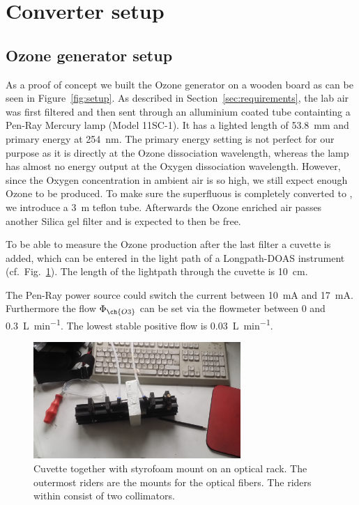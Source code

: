 \section{Converter setup}
\label{sec:setup}

\subsection{Ozone generator setup}
\label{sec:ozone-setup}

As a proof of concept we built the Ozone generator on a wooden board
as can be seen in Figure~\ref{fig:setup}. As described in
Section~\ref{sec:requirements}, the lab air was first filtered and
then sent through an alluminium coated tube containting a Pen-Ray
Mercury lamp (Model 11SC-1). It has a lighted length of
\SI{53.8}{\milli\meter} and primary energy at
\SI{254}{\nano\meter}. The primary energy setting is not perfect for
our purpose as it is directly at the Ozone dissociation wavelength,
whereas the lamp has almost no energy output at the Oxygen
dissociation wavelength. However, since the Oxygen concentration in
ambient air is so high, we still expect enough Ozone to be
produced. 
To make sure the superfluous  is completely converted to
, we introduce a \SI{3}{\meter} teflon tube. Afterwards the
Ozone enriched air passes another Silica gel filter and is expected to
then be  free.

To be able to measure the Ozone production after the last filter a
cuvette is added, which can be entered in the light path of a
Longpath-DOAS instrument (cf.\ Fig.~\ref{fig:cuvette}). The length of
the lightpath through the cuvette is \SI{10}{\centi\meter}. 

The Pen-Ray power source could switch the current between
\SI{10}{\milli\ampere} and \SI{17}{\milli\ampere}.  Furthermore the
flow $\Phi_{\ch{O 3}}$ can be set via the flowmeter between \num{0}
and \SI{0.3}{\liter\per\minute}. The lowest stable positive flow is
\SI{0.03}{\liter\per\minute}. 

\begin{figure}[htbp]
  \centering
  \includegraphics[width=0.7\textwidth]{images/cuvette.jpg}
  \caption{Cuvette together with styrofoam mount on an optical
    rack. The outermost riders are the mounts for the optical
    fibers. The riders within consist of two collimators.}
  \label{fig:cuvette}
\end{figure}

